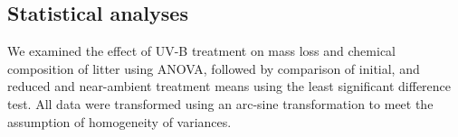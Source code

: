 \documentclass[
]{article}
\begin{document}
\subsection{Statistical analyses}\label{statistical-analyses}

We examined the effect of UV-B treatment on mass loss and chemical
composition of litter using ANOVA, followed by comparison of initial,
and reduced and near-ambient treatment means using the least significant
difference test. All data were transformed using an arc-sine
transformation to meet the assumption of homogeneity of variances.
\end{document}
